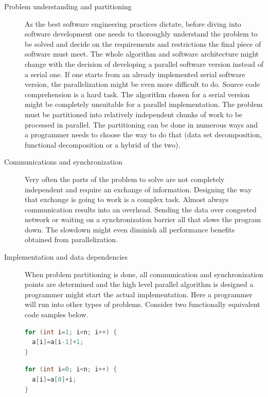 \begin{description}
\item[Problem understanding and partitioning] As the best software engineering practices dictate, before diving into software development one needs to thoroughly understand the problem to be solved and decide on the requirements and restrictions the final piece of software must meet. The whole algorithm and software architecture might change with the decision of developing a parallel software version instead of a serial one. If one starts from an already implemented serial software version, the parallelization might be even more difficult to do. Source code comprehension is a hard task. The algorithm chosen for a serial version might be completely unsuitable for a parallel implementation. The problem must be partitioned into relatively independent chunks of work to be processed in parallel. The partitioning can be done in numerous ways and a programmer needs to choose the way to do that (data set decomposition, functional decomposition or a hybrid of the two).
\item[Communications and synchronization] Very often the parts of the problem to solve are not completely independent and require an exchange of information. Designing the way that exchange is going to work is a complex task. Almost always communication results into an overhead. Sending the data over congested network or waiting on a synchronization barrier all that slows the program down. The slowdown might even diminish all performance benefits obtained from parallelization.
\item[Implementation and data dependencies] When problem partitioning is done, all communication and synchronization points are determined and the high level parallel algorithm is designed a programmer might start the actual implementation. Here a programmer will run into other types of problems. Consider two functionally equivalent code samples below.\newline\null
\begin{minipage}[t]{0.50\linewidth}
\begin{lstlisting}[caption={Non-parallelisable loop with a planted loop-carried data dependence.},label={lst:code_sample_data_dependence},language=C]
for (int i=1; i<n; i++) {
  a[i]=a[i-1]+1;
}
\end{lstlisting}
\end{minipage}
\begin{minipage}[t]{0.50\linewidth}
\begin{lstlisting}[caption={Parallelisable loop free of any data dependencies.}, label={lst:code_sample_no_data_dependence},language=C]
for (int i=0; i<n; i++) {
  a[i]=a[0]+i;
}
\end{lstlisting}
\end{minipage}


\end{description}
